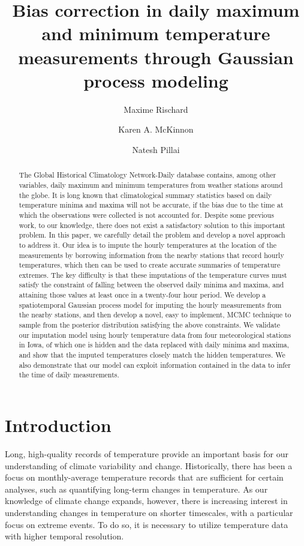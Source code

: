 \documentclass[letter]{article}
\title{
		Bias correction in daily maximum and minimum temperature measurements through Gaussian process modeling
		}
\author[*]{Maxime Rischard}
\author[**]{Karen A. McKinnon}
\author[*]{Natesh Pillai}
\affil[*]{Department of Statistics, Harvard University}
\affil[**]{National Center for Atmospheric Research; Descartes Labs}
\begin{document}
    
    
   \maketitle

 \begin{abstract}
The Global Historical Climatology Network-Daily database contains, among other variables, daily maximum and minimum temperatures from weather stations around the globe.
It is long known that climatological summary statistics based on daily temperature minima and maxima will not be accurate, if the bias due to the time at which the observations were collected is not accounted for. Despite some previous work, to our knowledge, there does not exist a satisfactory solution to this important problem.
In this paper, we carefully detail the problem and develop a novel approach to address it. Our idea is to impute the hourly temperatures
at the location of the measurements by borrowing information from the nearby stations that record hourly temperatures, which then can be used to create accurate summaries of temperature extremes.
The key difficulty is that these imputations of the temperature curves must satisfy the constraint of falling between the observed daily minima and maxima, and attaining those values at least once in a twenty-four hour period.
We develop a spatiotemporal Gaussian process model for imputing the hourly measurements from the nearby stations, and then develop a novel, easy to implement, MCMC technique to sample from the posterior distribution satisfying the above constraints. 
We validate our imputation model using hourly temperature data 
from four meteorological stations in Iowa,
of which one is hidden and the data replaced with daily minima and maxima,
and show that the imputed temperatures closely match the hidden temperatures.
We also demonstrate that our model can exploit information contained in the data to infer the time of daily measurements. 

\end{abstract}
    


        \section{Introduction}\label{introduction}
    

Long, high-quality records of temperature provide an important basis for our understanding of climate variability and change. Historically, there has been a focus on monthly-average temperature records that are sufficient for certain analyses, such as quantifying long-term changes in temperature. As our knowledge of climate change expands, however, there is increasing interest in understanding changes in temperature on shorter timescales, with a particular focus on extreme events. To do so, it is necessary to utilize temperature data with higher temporal resolution. 
\end{document}
